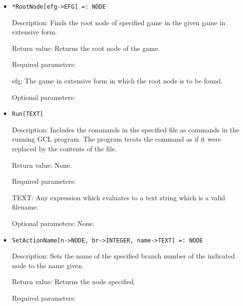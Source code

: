 \begin{itemize}
\item
\protect \large \begin{verbatim}
*RootNode[efg->EFG] =: NODE
\end{verbatim}\normalsize

\bd
\item
[Description:] Finds the root node of specified game in the given
game in extensive form.  
\item
[Return value:] Returns the root node of the game.
\item
[Required parameters:]\hfil\null
	
\bd
\item
[efg:] The game in extensive form in which the root node is to be
found.
\ed

\item
[Optional parameters:]\hfil\null

\ed

\item

\protect \large \begin{verbatim}
Run[TEXT]
\end{verbatim}\normalsize

\bd
\item
[Description:] Includes the commands in the specified file as commands
in the running GCL program.  The program treats the command as if it
were replaced by the contents of the file.
\item
[Return value:] None.
\item
[Required parameters:]\hfil\null
	
\bd
\item
[TEXT:] Any expression which evaluates to a text string which is a
valid filename.
\ed

\item
[Optional parameters:] None.
\ed


\item

\protect \large \begin{verbatim}
SetActionName[n->NODE, br->INTEGER, name->TEXT] =: NODE
\end{verbatim}\normalsize

\bd
\item
[Description:] Sets the name of the specified branch number of the
indicated node to the name given.
\item
[Return value:] Returns the node specified.
\item
[Required parameters:]\hfil\null
	

\end{itemize}
